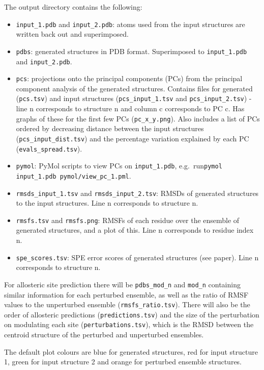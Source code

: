 The output directory contains the following:
\begin{itemize}
\item \verb|input_1.pdb| and \verb|input_2.pdb|: atoms used from the input structures are written back out and superimposed.
\item \verb|pdbs|: generated structures in PDB format. Superimposed to \verb|input_1.pdb| and \verb|input_2.pdb|.
\item \verb|pcs|: projections onto the principal components (PCs) from the principal component analysis of the generated structures. Contains files for generated (\verb|pcs.tsv|) and input structures (\verb|pcs_input_1.tsv| and \verb|pcs_input_2.tsv|) - line n corresponds to structure n and column c corresponds to PC c. Has graphs of these for the first few PCs (\verb|pc_x_y.png|). Also includes a list of PCs ordered by decreasing distance between the input structures (\verb|pcs_input_dist.tsv|) and the percentage variation explained by each PC (\verb|evals_spread.tsv|).
\item \verb|pymol|: PyMol scripts to view PCs on \verb|input_1.pdb|, e.g.\ run\newline \verb|pymol input_1.pdb pymol/view_pc_1.pml|.
\item \verb|rmsds_input_1.tsv| and \verb|rmsds_input_2.tsv|: RMSDs of generated structures to the input structures. Line n corresponds to structure n.
\item \verb|rmsfs.tsv| and \verb|rmsfs.png|: RMSFs of each residue over the ensemble of generated structures, and a plot of this. Line n corresponds to residue index n.
\item \verb|spe_scores.tsv|: SPE error scores of generated structures (see paper). Line n corresponds to structure n.
\end{itemize}

For allosteric site prediction there will be \verb|pdbs_mod_n| and \verb|mod_n| containing similar information for each perturbed ensemble, as well as the ratio of RMSF values to the unperturbed ensemble (\verb|rmsfs_ratio.tsv|). There will also be the order of allosteric predictions (\verb|predictions.tsv|) and the size of the perturbation on modulating each site (\verb|perturbations.tsv|), which is the RMSD between the centroid structure of the perturbed and unperturbed ensembles.

The default plot colours are blue for generated structures, red for input structure 1, green for input structure 2 and orange for perturbed ensemble structures.


